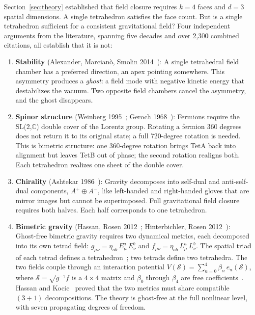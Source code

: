 \documentclass[aps,prd,preprint,superscriptaddress,showpacs,preprintnumbers,amsmath,amssymb,nofootinbib]{revtex4-2}
\begin{document}
Section~\ref{sec:theory} established that field closure requires $k = 4$ faces and $d = 3$ spatial dimensions. A single tetrahedron satisfies the face count. But is a single tetrahedron sufficient for a consistent gravitational field? Four independent arguments from the literature, spanning five decades and over 2,300 combined citations, all establish that it is not:

\begin{enumerate}
\item \textbf{Stability} (Alexander, Marcian\`o, Smolin 2014~\cite{alexander2014}): A single tetrahedral field chamber has a preferred direction, an apex pointing somewhere. This asymmetry produces a \emph{ghost}: a field mode with negative kinetic energy that destabilizes the vacuum. Two opposite field chambers cancel the asymmetry, and the ghost disappears.

\item \textbf{Spinor structure} (Weinberg 1995~\cite{weinberg1995}; Geroch 1968~\cite{geroch1968}): Fermions require the SL(2,$\mathbb{C}$) double cover of the Lorentz group. Rotating a fermion 360 degrees does not return it to its original state; a full 720-degree rotation is needed. This is bimetric structure: one 360-degree rotation brings TetA back into alignment but leaves TetB out of phase; the second rotation realigns both. Each tetrahedron realizes one sheet of the double cover.

\item \textbf{Chirality} (Ashtekar 1986~\cite{ashtekar1986}): Gravity decomposes into self-dual and anti-self-dual components, $A^+ \oplus A^-$, like left-handed and right-handed gloves that are mirror images but cannot be superimposed. Full gravitational field closure requires both halves. Each half corresponds to one tetrahedron.

\item \textbf{Bimetric gravity} (Hassan, Rosen 2012~\cite{hassan2012}; Hinterbichler, Rosen 2012~\cite{hinterbichler2012}): Ghost-free bimetric gravity requires two dynamical metrics, each decomposed into its own tetrad field: $g_{\mu\nu} = \eta_{ab}\,E^a_\mu\,E^b_\nu$ and $f_{\mu\nu} = \eta_{ab}\,L^a_\mu\,L^b_\nu$. The spatial triad of each tetrad defines a tetrahedron~\cite{barbieri1998}; two tetrads define two tetrahedra. The two fields couple through an interaction potential $V(\mathcal{S}) = \sum_{n=0}^{4} \beta_n\,e_n(\mathcal{S})$, where $\mathcal{S} = \sqrt{g^{-1}f}$ is a $4 \times 4$ matrix and $\beta_0$ through $\beta_4$ are free coefficients~\cite{hassan2012}. Hassan and Kocic~\cite{hassankocic2018} proved that the two metrics must share compatible $(3{+}1)$ decompositions. The theory is ghost-free at the full nonlinear level, with seven propagating degrees of freedom.
\end{enumerate}
\end{document}
